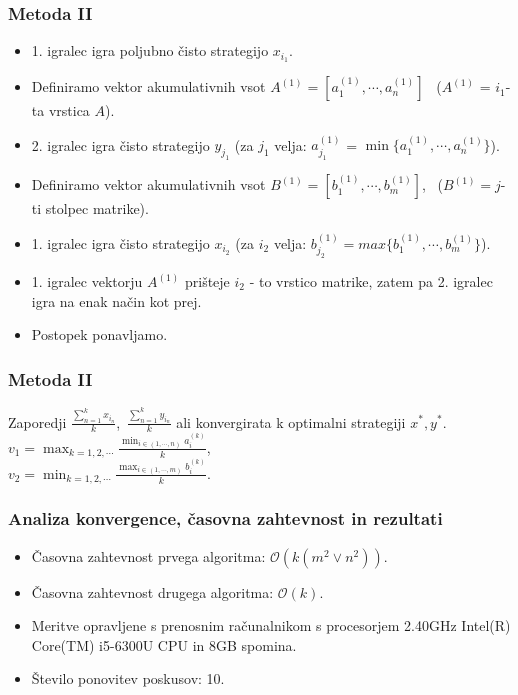\documentclass{beamer}
\theoremstyle{definition}
\theoremstyle{plain}
\begin{document}
\begin{frame}
    \frametitle{Metoda II}
    \begin{itemize}
    \item 1. igralec igra poljubno čisto strategijo $x_{i_1}$.
    \item Definiramo vektor akumulativnih vsot $A^{(1)} = [a_1^{(1)}, \cdots, a_n^{(1)}]$ \, ($A^{(1)}$ = $i_1$-ta vrstica $A$). 
    \item 2. igralec igra čisto strategijo $y_{j_1}$ (za $j_1$  velja: $a_{j_1}^{(1)}$ = $\min \{a_1^{(1)}, \cdots, a_n^{(1)}\}$).
    \item Definiramo vektor akumulativnih vsot $B^{(1)} = [b_1^{(1)}, \cdots, b_m^{(1)}]$, \, ($B^{(1)}= j$-ti stolpec matrike).
    \item 1. igralec igra čisto strategijo $x_{i_2}$ (za $i_2$ velja: $b_{j_2}^{(1)} = max\{b_1^{(1)}, \cdots, b_m^{(1)}\}$).
    \item 1. igralec vektorju $A^{(1)}$ prišteje $i_2$ - to vrstico matrike, zatem pa 2. igralec igra na enak način kot prej.
    \item Postopek ponavljamo.
    \end{itemize}
\end{frame}
\begin{frame}
    \frametitle{Metoda II}
    Zaporedji  $\frac{\sum_{n=1}^k x_{i_n}}{k}$, $\,\frac{\sum_{n=1}^k y_{i_n}}{k}$  ali konvergirata k optimalni strategiji $x^*, y^*$. \\
     $v_1 = \max_{k = 1, 2, \cdots} \frac{\min_{i \in (1, \cdots, n)} a_i^{(k)}}{k}$, \\
$v_2 = \min_{k = 1, 2, \cdots} \frac{\max_{i \in (1, \cdots, m)} b_i^{(k)}}{k}$.
\end{frame}
\begin{frame}
\frametitle{Analiza konvergence, časovna zahtevnost in rezultati}
\begin{itemize}
\item Časovna zahtevnost prvega algoritma: $\mathcal{O}(k (m^2 \vee n^2))$.
\item Časovna zahtevnost drugega algoritma: $\mathcal{O}(k)$.
\item Meritve opravljene s prenosnim računalnikom s procesorjem 2.40GHz Intel(R) Core(TM) i5-6300U CPU in 8GB spomina. 
\item Število ponovitev poskusov: 10.
\end{itemize}
\end{frame}
\end{document}
